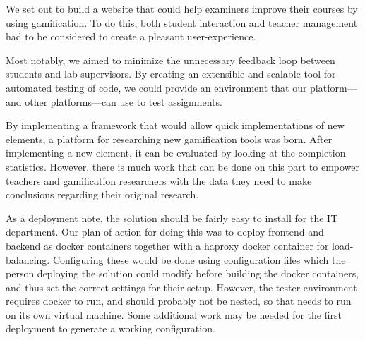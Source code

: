 We set out to build a website that could help examiners improve their courses by using gamification. To do this, both student interaction and teacher management had to be considered to create a pleasant user-experience.

Most notably, we aimed to minimize the unnecessary feedback loop between students and lab-supervisors. By creating an extensible and scalable tool for automated testing of code, we could provide an environment that our platform---and other platforms---can use to test assignments.

By implementing a framework that would allow quick implementations of new elements, a platform for researching new gamification tools was born. After implementing a new element, it can be evaluated by looking at the completion statistics. However, there is much work that can be done on this part to empower teachers and gamification researchers with the data they need to make conclusions regarding their original research.

As a deployment note, the solution should be fairly easy to install for the IT department. Our plan of action for doing this was to deploy frontend and backend as docker containers together with a haproxy docker container for load-balancing. Configuring these would be done using configuration files which the person deploying the solution could modify before building the docker containers, and thus set the correct settings for their setup. However, the tester environment requires docker to run, and should probably not be nested\cite{nesteddocker}, so that needs to run on its own virtual machine. Some additional work may be needed for the first deployment to generate a working configuration.
